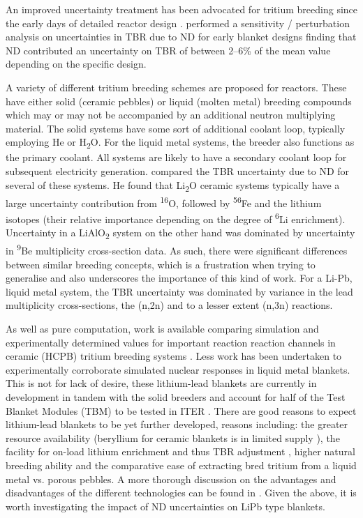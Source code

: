 An improved uncertainty treatment has been advocated for tritium breeding since the early days of detailed reactor design \cite{Abdou1986}. \citeauthor{Youssef1986} performed a sensitivity / perturbation analysis on uncertainties in TBR due to ND for early blanket designs finding that ND contributed an uncertainty on TBR of between 2--6\% of the mean value depending on the specific design. 

A variety of different tritium breeding schemes are proposed for reactors. These have either solid (ceramic pebbles) or liquid (molten metal) breeding compounds which may or may not be accompanied by an additional neutron multiplying material. The solid systems have some sort of additional coolant loop, typically employing He or H\textsubscript{2}O. For the liquid metal systems, the breeder also functions as the primary coolant. All systems are likely to have a secondary coolant loop for subsequent electricity generation. \citeauthor{Youssef1986} compared the TBR uncertainty due to ND for several of these systems. He found that Li\textsubscript{2}O ceramic systems typically have a large uncertainty contribution from \textsuperscript{16}O, followed by \textsuperscript{56}Fe and the lithium isotopes (their relative importance depending on the degree of \textsuperscript{6}Li enrichment). Uncertainty in a LiAlO\textsubscript{2} system on the other hand was dominated by uncertainty in \textsuperscript{9}Be multiplicity cross-section data. As such, there were significant differences between similar breeding concepts, which is a frustration when trying to generalise and also underscores the importance of this kind of work. For a Li-Pb, liquid metal system, the TBR uncertainty was dominated by variance in the lead multiplicity cross-sections, the (n,2n) and to a lesser extent (n,3n) reactions.

As well as pure computation, work is available comparing simulation and experimentally determined values for important reaction reaction channels in ceramic (HCPB) tritium breeding systems \cite{Batistoni2007}. Less work has been undertaken to experimentally corroborate simulated nuclear responses in liquid metal blankets. This is not for lack of desire, these lithium-lead blankets are currently in development in tandem with the solid breeders and account for half of the Test Blanket Modules (TBM) to be tested in ITER \cite{Chuyanov2010}. There are good reasons to expect lithium-lead blankets to be yet further developed, reasons including: the greater resource availability (beryllium for ceramic blankets is in limited supply \cite{Bradshaw2011} \cite{Shimwell2014}), the facility for on-load lithium enrichment and thus TBR adjustment \cite{Ihli2008}, higher natural breeding ability \cite{Colling2012} and the comparative ease of extracting bred tritium from a liquid metal vs. porous pebbles. A more thorough discussion on the advantages and disadvantages of the different technologies can be found in \cite{Abdou2015}. Given the above, it is worth investigating the impact of ND uncertainties on LiPb type blankets.

